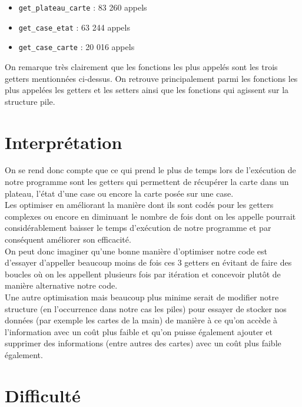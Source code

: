 \documentclass[a4paper, 12pt]{article}
\begin{document}
\begin{itemize}[label=$\cdot$]
    \item \verb|get_plateau_carte| : 83 260 appels
    \item \verb|get_case_etat| : 63 244 appels
    \item \verb|get_case_carte| : 20 016 appels
\end{itemize}

On remarque très clairement que les fonctions les plus appelés sont les trois getters mentionnées ci-dessus. On retrouve principalement parmi les fonctions les plus appelées les getters et les setters ainsi que les fonctions qui agissent sur la structure pile.

\section{Interprétation}

On se rend donc compte que ce qui prend le plus de temps lors de l'exécution de notre programme sont les getters qui permettent de récupérer la carte dans un plateau, l'état d'une case ou encore la carte posée sur une case.\\

Les optimiser en améliorant la manière dont ils sont codés pour les getters complexes ou encore en diminuant le nombre de fois dont on les appelle pourrait considérablement baisser le temps d'exécution de notre programme et par conséquent améliorer son efficacité.\\

On peut donc imaginer qu'une bonne manière d'optimiser notre code est d'essayer d'appeller beaucoup moins de fois ces 3 getters en évitant de faire des boucles où on les appellent plusieurs fois par itération et concevoir plutôt de manière alternative notre code.\\

Une autre optimisation mais beaucoup plus minime serait de modifier notre structure (en l'occurrence dans notre cas les piles) pour essayer de stocker nos données (par exemple les cartes de la main) de manière à ce qu'on accède à l'information avec un coût plus faible et qu'on puisse également ajouter et supprimer des informations (entre autres des cartes) avec un coût plus faible également.

\section{Difficulté}
\end{document}
